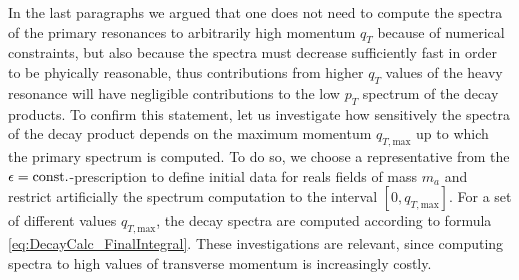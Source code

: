 In the last paragraphs we argued that one does not need to compute the spectra of the primary resonances to arbitrarily high momentum $q_T$ because of numerical constraints, but also because the spectra must decrease sufficiently fast in order to be phyically reasonable, thus contributions from higher $q_T$ values of the heavy resonance will have negligible contributions to the low $p_T$ spectrum of the decay products. To confirm this statement, let us investigate how sensitively the spectra of the decay product depends on the maximum momentum $q_{T,\text{max}}$ up to which the primary spectrum is computed. To do so, we choose a representative from the $\epsilon={\text{const.}}$-prescription to define initial data for reals fields of mass $m_a$ and restrict artificially the spectrum computation to the interval ${[0,q_{T,\text{max}}]}$. For a set of different values $q_{T,\text{max}}$, the decay spectra are computed according to formula \eqref{eq:DecayCalc_FinalIntegral}. These investigations are relevant, since computing spectra to high values of transverse momentum is increasingly costly.\\\noindent
